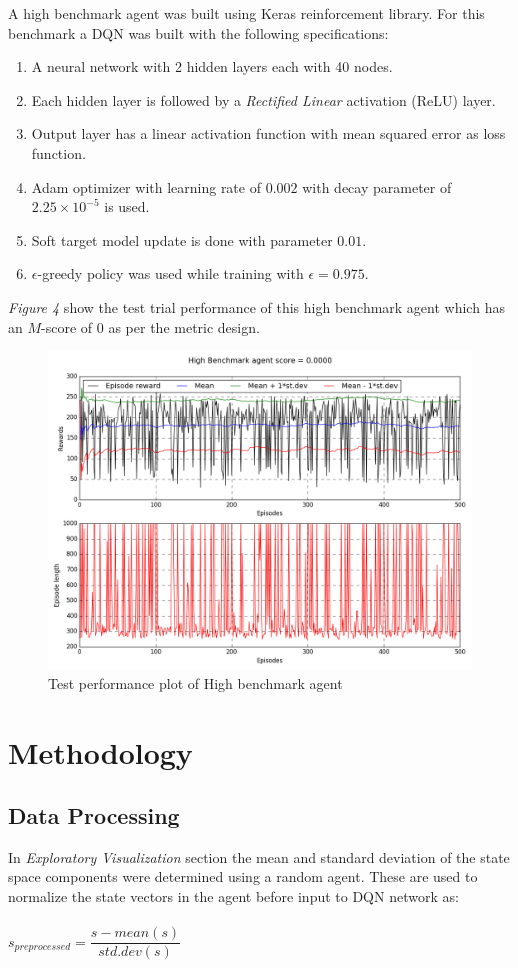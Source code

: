 \documentclass{article}
\begin{document}
A high benchmark agent was built using Keras reinforcement library\cite{kerasrl}. For this benchmark a DQN was built with the following specifications:
\vspace{-0.1cm}
\begin{enumerate}
	\item A neural network with 2 hidden layers each with 40 nodes.
	\item Each hidden layer is followed by a \textit{Rectified Linear} activation (ReLU) layer.
	\item Output layer has a linear activation function with mean squared error as loss function.
	\item Adam optimizer with learning rate of $0.002$ with decay parameter of $2.25\times10^{-5}$ is used.
	\item Soft target model update is done with parameter $0.01$.
	\item $\epsilon$-greedy policy was used while training with $\epsilon = 0.975$.
\end{enumerate}
\textit{Figure 4} show the test trial performance of this high benchmark agent which has an $M$-score of $0$ as per the metric design.
\begin{figure}[H]
	\caption{Test performance plot of High benchmark agent}
	\centering
	\includegraphics[width=13cm,trim={0 0 0 0},clip]{img/highbenchmark_test_evaluation}
\end{figure}	
\section{Methodology}
\subsection*{Data Processing}
In \textit{Exploratory Visualization} section the mean and standard deviation of the state space components were determined using a random agent. These are used to normalize the state vectors in the agent before input to DQN network as:\\\\
$s_{preprocessed} = \dfrac{s - mean(s)}{std.dev(s)}$
\end{document}
